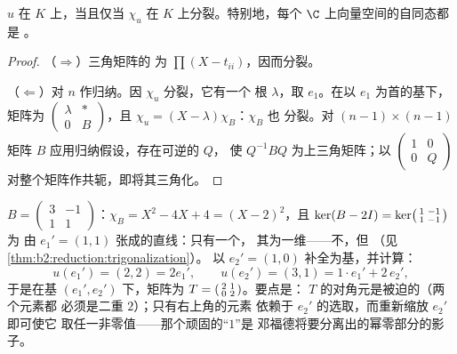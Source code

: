 \begin{theorem}[三角化]\label{thm:b2:reduction:trigonalization}
$u$ 在 $K$ 上，当且仅当 $\chi_u$ 在
$K$ 上分裂。特别地，每个 $\C$ 上向量空间的自同态都是
。
\end{theorem}

\begin{proof}
（$\Rightarrow$）三角矩阵的
为 $\prod(X - t_{ii})$，因而分裂。

（$\Leftarrow$）对 $n$ 作归纳。因 $\chi_u$ 分裂，它有一个
根 $\lambda$，取 $e_1$。在以
$e_1$ 为首的基下，矩阵为 $\begin{pmatrix} \lambda & \ast\\ 0 &
B\end{pmatrix}$，且 $\chi_u = (X - \lambda)\chi_B$：$\chi_B$ 也
分裂。对 $(n-1) \times
(n-1)$ 矩阵 $B$ 应用归纳假设，存在可逆的 $Q$，
使 $Q^{-1}BQ$ 为上三角矩阵；以 $\begin{pmatrix}1 & 0\\
0 & Q\end{pmatrix}$ 对整个矩阵作共轭，即将其三角化。
\end{proof}

\begin{example}[手工三角化]\label{ex:b2:reduction:trigwork}
$B = \begin{pmatrix}3 & -1\\ 1 & 1\end{pmatrix}$：$\chi_B = X^2 -
4X + 4 = (X - 2)^2$，且 $\ker(B - 2I) =
\ker\begin{psmallmatrix}1 & -1\\ 1 & -1\end{psmallmatrix}$ 为
由 $e_1' = (1, 1)$ 张成的直线：只有一个，
其为一维——不，但
（见\cref{thm:b2:reduction:trigonalization}）。
以 $e_2' = (1, 0)$ 补全为基，并计算：
\[
u(e_1') = (2, 2) = 2e_1',
\qquad
u(e_2') = (3, 1) = 1\cdot e_1' + 2\, e_2' ,
\]
于是在基 $(e_1', e_2')$ 下，矩阵为 $T =
\begin{psmallmatrix}2 & 1\\ 0 & 2\end{psmallmatrix}$。要点是：
$T$ 的对角元是被迫的（两个元素都
必须是二重 $2$）；只有右上角的元素
依赖于 $e_2'$ 的选取，而重新缩放 $e_2'$ 即可使它
取任一非零值——那个顽固的“$1$”是
邓福德将要分离出的幂零部分的影子。
\end{example}

